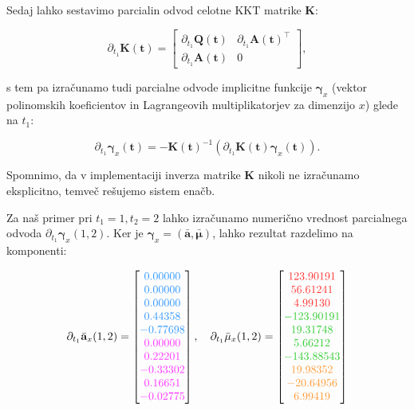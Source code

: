 \documentclass[mat2, tisk]{fmfdelo}
\newcommand{\aimplicit}{\bar{\mathbf{a}}}
\newcommand{\muimplicit}{\bar{\mathbf{\mu}}}
\newcommand{\yimplicit}{\mathbf{\gamma}}
\newcommand{\qmat}{\mathbf{Q}}
\newcommand{\amat}{\mathbf{A}}
\newcommand{\kmat}{\mathbf{K}}
\newcommand{\tvec}{\mathbf{t}}
\begin{document}
Sedaj lahko sestavimo parcialin odvod celotne KKT matrike $\kmat$:

\begin{equation}
\partial_{t_1} \kmat(\tvec) =
\begin{bmatrix}
    \partial_{t_1} \qmat(\tvec) & \partial_{t_1} \amat(\tvec)^\top \\
    \partial_{t_1} \amat(\tvec) & 0
\end{bmatrix},
\end{equation}

s tem pa izračunamo tudi parcialne odvode implicitne funkcije $\yimplicit_x$ (vektor polinomskih koeficientov in Lagrangeovih multiplikatorjev za dimenzijo $x$) glede na $t_1$:

\begin{equation}
\partial_{t_1} \yimplicit_x(\tvec) = -\kmat(\tvec)^{-1} (\partial_{t_1} \kmat(\tvec) \yimplicit_x(\tvec)).
\end{equation}

Spomnimo, da v implementaciji inverza matrike $\kmat$ nikoli ne izračunamo eksplicitno, temveč rešujemo sistem enačb.

Za naš primer pri $t_1 = 1, t_2 = 2$ lahko izračunamo numerično vrednost parcialnega odvoda $\partial_{t_1} \yimplicit_x(1, 2)$. Ker je $\yimplicit_x = (\aimplicit, \muimplicit)$, lahko rezultat razdelimo na komponenti:

\begin{equation}
\partial_{t_1} \aimplicit_x(1, 2) = 
\begin{bmatrix}
\textcolor{block1color}{0.00000} \\
\textcolor{block1color}{0.00000} \\
\textcolor{block1color}{0.00000} \\
\textcolor{block1color}{0.44358} \\
\textcolor{block1color}{-0.77698} \\
\textcolor{block2color}{0.00000} \\
\textcolor{block2color}{0.22201} \\
\textcolor{block2color}{-0.33302} \\
\textcolor{block2color}{0.16651} \\
\textcolor{block2color}{-0.02775}
\end{bmatrix}, \quad
\partial_{t_1} \muimplicit_x(1, 2) = 
\begin{bmatrix}
\textcolor{block3color}{123.90191} \\
\textcolor{block3color}{56.61241} \\
\textcolor{block3color}{4.99130} \\
\textcolor{block4color}{-123.90191} \\
\textcolor{block4color}{19.31748} \\
\textcolor{block4color}{5.66212} \\
\textcolor{block4color}{-143.88543} \\
\textcolor{block6color}{19.98352} \\
\textcolor{block6color}{-20.64956} \\
\textcolor{block6color}{6.99419}
\end{bmatrix}
\end{equation}
\end{document}
